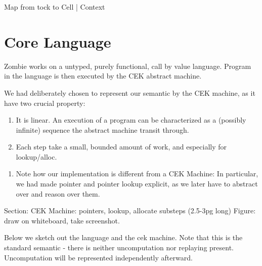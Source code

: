\documentclass[acmsmall]{acmart}
\begin{document}
Map from tock to Cell | Context

\section{Core Language}	
Zombie works on a untyped, purely functional, call by value language. Program in the language is then executed by the CEK abstract machine.

We had deliberately chosen to represent our semantic by the CEK machine, as it have two crucial property:

\begin{enumerate}
	\item It is linear. An execution of a program can be characterized as a (possibly infinite) sequence the abstract machine transit through.

	\item Each step take a small, bounded amount of work, and especially for lookup/alloc.
\end{enumerate}

\begin{enumerate}
	\item Note how our implementation is different from a CEK Machine: In particular, we had made pointer and pointer lookup explicit, as we later have to abstract over and reason over them. 
\end{enumerate}

Section: CEK Machine: pointers, lookup, allocate substeps (2.5-3pg long)
Figure: draw on whiteboard, take screenshot.
	
Below we sketch out the language and the cek machine. Note that this is the standard semantic - there is neither uncomputation nor replaying present. Uncomputation will be represented independently afterward.
\end{document}
